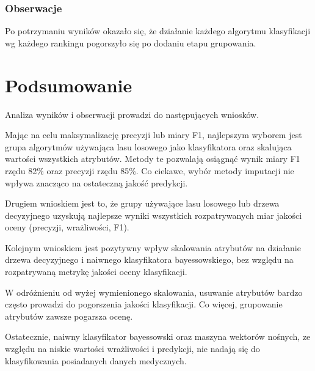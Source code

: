 \documentclass[../thesis.tex]{subfiles}
\begin{document}
\subsubsection{Obserwacje}

Po potrzymaniu wyników okazało się, że działanie każdego algorytmu klasyfikacji wg każdego rankingu pogorszyło się po dodaniu etapu grupowania.

\section{Podsumowanie}

Analiza wyników i obserwacji prowadzi do następujących wniosków.

Mając na celu maksymalizację precyzji lub miary F1, najlepszym wyborem jest grupa algorytmów używająca lasu losowego jako klasyfikatora oraz skalująca wartości wszystkich atrybutów. Metody te pozwalają osiągnąć wynik miary F1 rzędu 82\% oraz precyzji rzędu 85\%. Co ciekawe, wybór metody imputacji nie wpływa znacząco na ostateczną jakość predykcji.

Drugiem wnioskiem jest to, że grupy używające lasu losowego lub drzewa decyzyjnego uzyskują najlepsze wyniki wszystkich rozpatrywanych miar jakości oceny (precyzji, wrażliwości, F1).

Kolejnym wnioskiem jest pozytywny wpływ skalowania atrybutów na działanie drzewa decyzyjnego i naiwnego klasyfikatora bayessowskiego, bez względu na rozpatrywaną metrykę jakości oceny klasyfikacji.

W odróżnieniu od wyżej wymienionego skalowania, usuwanie atrybutów bardzo często prowadzi do pogorszenia jakości klasyfikacji. Co więcej, grupowanie atrybutów zawsze pogarsza ocenę.

Ostatecznie, naiwny klasyfikator bayessowski oraz maszyna wektorów nośnych, ze względu na niskie wartości wrażliwości i predykcji, nie nadają się do klasyfikowania posiadanych danych medycznych.
\end{document}

